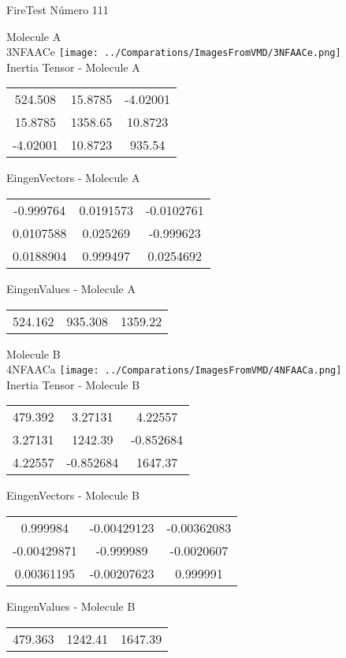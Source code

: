 \vtab[-2cm]
\begin{center}
{\large FireTest \tab Número 111}
\end{center}
\begin{multicols}{2}
\begin{center}

Molecule A \\ 
3NFAACe
\texttt{[image: ../Comparations/ImagesFromVMD/3NFAACe.png]}
\\
Inertia Tensor - Molecule A \\
\vtab

\begin{tabular}{|c c c|}
524.508	 & 	15.8785	 & 	-4.02001	 \\
15.8785	 & 	1358.65	 & 	10.8723	 \\
-4.02001	 & 	10.8723	 & 	935.54
\end{tabular}

\vtab
 EingenVectors - Molecule A     \\
\vtab
\begin{tabular}{|c c c|}
-0.999764	 & 	0.0191573	 & 	-0.0102761	 \\
0.0107588	 & 	0.025269	 & 	-0.999623	 \\
0.0188904	 & 	0.999497	 & 	0.0254692
\end{tabular}

\vtab
 EingenValues - Molecule A     \\
\vtab
\begin{tabular}{|c c c|}
524.162	 & 	935.308	 & 	1359.22	 \\
\end{tabular}
\columnbreak

Molecule B \\ 
4NFAACa
\texttt{[image: ../Comparations/ImagesFromVMD/4NFAACa.png]}
\\
Inertia Tensor - Molecule B \\
\vtab

\begin{tabular}{|c c c|}
479.392	 & 	3.27131	 & 	4.22557	 \\
3.27131	 & 	1242.39	 & 	-0.852684	 \\
4.22557	 & 	-0.852684	 & 	1647.37
\end{tabular}

\vtab
 EingenVectors - Molecule B     \\
\vtab
\begin{tabular}{|c c c|}
0.999984	 & 	-0.00429123	 & 	-0.00362083	 \\
-0.00429871	 & 	-0.999989	 & 	-0.0020607	 \\
0.00361195	 & 	-0.00207623	 & 	0.999991
\end{tabular}

\vtab
 EingenValues - Molecule B     \\
\vtab
\begin{tabular}{|c c c|}
479.363	 & 	1242.41	 & 	1647.39	 \\
\end{tabular}

\end{center}
\end{multicols}

